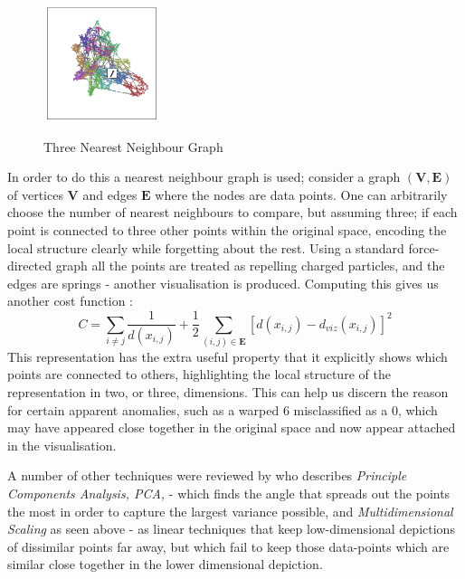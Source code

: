 \documentclass[a4paper,11pt,titlepage]{article}
\begin{document}
 	\begin{figure}[H]
    			\centering	
			{{\includegraphics[width=0.3\textwidth]
    				{img/colah_nearest_neighbour.png} 
    			}}%
    			\caption{Three Nearest Neighbour Graph}%
    		\label{fig:3nn}
	\end{figure}	 	
 		
		\par 
		In order to do this a nearest neighbour graph is used; consider a graph $ ( \bm{V}, \bm{E}) $ of vertices $ \bm{V} $ and edges $ \bm{E} $ where the nodes are data points. One can arbitrarily choose the number of nearest neighbours to compare, but assuming three; if each point is connected to three other points within the original space, encoding the local structure clearly while forgetting about the rest. Using a standard force-directed graph all the points are treated as repelling charged particles, and the edges are springs - another visualisation is produced. Computing this gives us another cost function \cite{Olah2014b}:
		$$
			C = 
			\sum\limits_{i \neq j}
			\frac{1}{d(x_{i,j})} + 
			\frac{1}{2}
			\sum\limits_{ (i,j) \in \bm{E} } [ d(x_{i,j}) - d_{viz}(x_{i,j}) ]^2
		$$
		This representation has the extra useful property that it explicitly shows which points are connected to others, highlighting the local structure of the representation in two, or three, dimensions. This can help us discern the reason for certain apparent anomalies, such as a warped 6 misclassified as a 0, which may have appeared close together in the original space and now appear attached in the visualisation.			
		\par 
		A number of other techniques were reviewed by \cite{VanderMaaten2009} who describes \textit{Principle Components Analysis, PCA,} \cite{Hotelling33} - which finds the angle that spreads out the points the most in order to capture the largest variance possible, and \textit{Multidimensional Scaling} as seen above - as linear techniques that keep low-dimensional depictions of dissimilar points far away, but which fail to keep those data-points which are similar close together in the lower dimensional depiction.
 		
\end{document}
